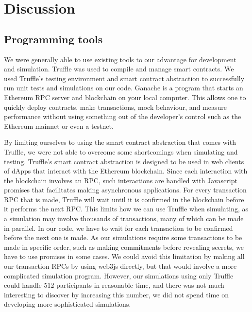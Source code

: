 \chapter{Discussion}
\label{chap:discussion}


\section{Programming tools}
\label{sec:tools}

We were generally able to use existing tools to our advantage for development and simulation. Truffle was used to compile and manage smart contracts. We used Truffle's testing environment and smart contract abstraction to successfully run unit tests and simulations on our code. Ganache is a program that starts an Ethereum RPC server and blockchain on your local computer. This allows one to quickly deploy contracts, make transactions, mock behaviour, and measure performance without using something out of the developer's control such as the Ethereum mainnet or even a testnet.

By limiting ourselves to using the smart contract abstraction that comes with Truffle, we were not able to overcome some shortcomings when simulating and testing. Truffle's smart contract abstraction is designed to be used in web clients of dApps that interact with the Ethereum blockchain. Since each interaction with the blockchain involves an RPC, such interactions are handled with Javascript promises that facilitates making asynchronous applications. For every transaction RPC that is made, Truffle will wait until it is confirmed in the blockchain before it performs the next RPC. This limits how we can use Truffle when simulating, as a simulation may involve thousands of transactions, many of which can be made in parallel. In our code, we have to wait for each transaction to be confirmed before the next one is made. As our simulations require some transactions to be made in specific order, such as making commitments before revealing secrets, we have to use promises in some cases. We could avoid this limitation by making all our transaction RPCs by using web3js directly, but that would involve a more complicated simulation program. However, our simulations using only Truffle could handle 512 participants in reasonable time, and there was not much interesting to discover by increasing this number, we did not spend time on developing more sophisticated simulations. 

